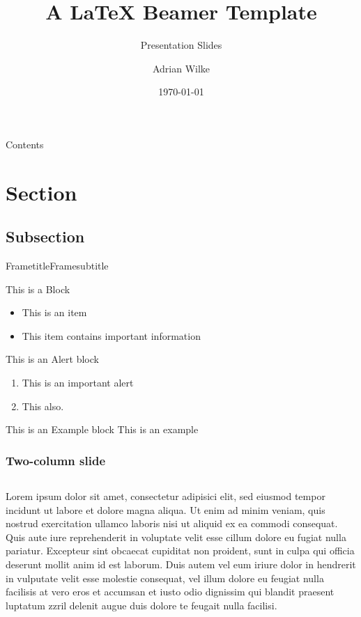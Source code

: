 \documentclass{beamer}
\author[A.~Wilke]{Adrian Wilke}
\institute[]{DICE Group\\Paderborn University}
\title[Beamer Template]{A LaTeX Beamer Template}
\subtitle{Presentation Slides}
\date{\today}
\begin{document}
{ 
	\frame{\titlepage}
}\addtocounter{framenumber}{-1}

\begin{frame}{Contents}
	\tableofcontents
\end{frame}

\section{Section}
\subsection{Subsection}

\begin{frame}{Frametitle}{Framesubtitle}
	\begin{block}{This is a Block}
	\begin{itemize}
		\item This is an item
		\item This item contains \alert{important information}
	\end{itemize}
	\end{block}
	\begin{alertblock}{This is an Alert block}
		\begin{enumerate}
		\item This is an important alert
		\item This also.
	\end{enumerate}
	\end{alertblock}
	\begin{exampleblock}{This is an Example block}
		This is an example 
	\end{exampleblock}
\end{frame}

\begin{frame}
	\frametitle{Two-column slide}
	\begin{columns}[T]
	Lorem ipsum dolor sit amet, consectetur adipisici elit, sed eiusmod tempor incidunt ut labore et dolore magna aliqua. Ut enim ad minim veniam, quis nostrud exercitation ullamco laboris nisi ut aliquid ex ea commodi consequat. Quis aute iure reprehenderit in voluptate velit esse cillum dolore eu fugiat nulla pariatur. Excepteur sint obcaecat cupiditat non proident, sunt in culpa qui officia deserunt mollit anim id est laborum.
	Duis autem vel eum iriure dolor in hendrerit in vulputate velit esse molestie consequat, vel illum dolore eu feugiat nulla facilisis at vero eros et accumsan et iusto odio dignissim qui blandit praesent luptatum zzril delenit augue duis dolore te feugait nulla facilisi.
	\end{columns}
\end{frame}
\end{document}
